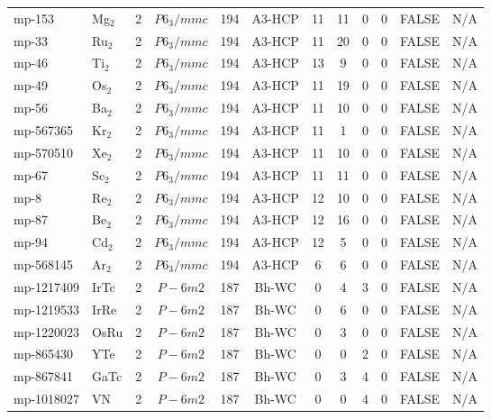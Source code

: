 {\begin{longtable}{llcccccccccc}
    mp-153 & Mg$_{2}$ & 2     & $P6_3/mmc$ & 194   & A3-HCP & 11    & 11    & 0     & 0     & FALSE & N/A \\
    mp-33 & Ru$_{2}$ & 2     & $P6_3/mmc$ & 194   & A3-HCP & 11    & 20    & 0     & 0     & FALSE & N/A \\
    mp-46 & Ti$_{2}$ & 2     & $P6_3/mmc$ & 194   & A3-HCP & 13    & 9     & 0     & 0     & FALSE & N/A \\
    mp-49 & Os$_{2}$ & 2     & $P6_3/mmc$ & 194   & A3-HCP & 11    & 19    & 0     & 0     & FALSE & N/A \\
    mp-56 & Ba$_{2}$ & 2     & $P6_3/mmc$ & 194   & A3-HCP & 11    & 10    & 0     & 0     & FALSE & N/A \\
    mp-567365 & Kr$_{2}$ & 2     & $P6_3/mmc$ & 194   & A3-HCP & 11    & 1     & 0     & 0     & FALSE & N/A \\
    mp-570510 & Xe$_{2}$ & 2     & $P6_3/mmc$ & 194   & A3-HCP & 11    & 10    & 0     & 0     & FALSE & N/A \\
    mp-67 & Sc$_{2}$ & 2     & $P6_3/mmc$ & 194   & A3-HCP & 11    & 11    & 0     & 0     & FALSE & N/A \\
    mp-8  & Re$_{2}$ & 2     & $P6_3/mmc$ & 194   & A3-HCP & 12    & 10    & 0     & 0     & FALSE & N/A \\
    mp-87 & Be$_{2}$ & 2     & $P6_3/mmc$ & 194   & A3-HCP & 12    & 16    & 0     & 0     & FALSE & N/A \\
    mp-94 & Cd$_{2}$ & 2     & $P6_3/mmc$ & 194   & A3-HCP & 12    & 5     & 0     & 0     & FALSE & N/A \\
    mp-568145 & Ar$_{2}$ & 2     & $P6_3/mmc$ & 194   & A3-HCP & 6     & 6     & 0     & 0     & FALSE & N/A \\
    mp-1217409 & IrTc  & 2     & $P-6m2$ & 187   & Bh-WC & 0     & 4     & 3     & 0     & FALSE & N/A \\
    mp-1219533 & IrRe  & 2     & $P-6m2$ & 187   & Bh-WC & 0     & 6     & 0     & 0     & FALSE & N/A \\
    mp-1220023 & OsRu  & 2     & $P-6m2$ & 187   & Bh-WC & 0     & 3     & 0     & 0     & FALSE & N/A \\
    mp-865430 & YTe   & 2     & $P-6m2$ & 187   & Bh-WC & 0     & 0     & 2     & 0     & FALSE & N/A \\
    mp-867841 & GaTc  & 2     & $P-6m2$ & 187   & Bh-WC & 0     & 3     & 4     & 0     & FALSE & N/A \\
    mp-1018027 & VN    & 2     & $P-6m2$ & 187   & Bh-WC & 0     & 0     & 4     & 0     & FALSE & N/A \\

\end{longtable}}
